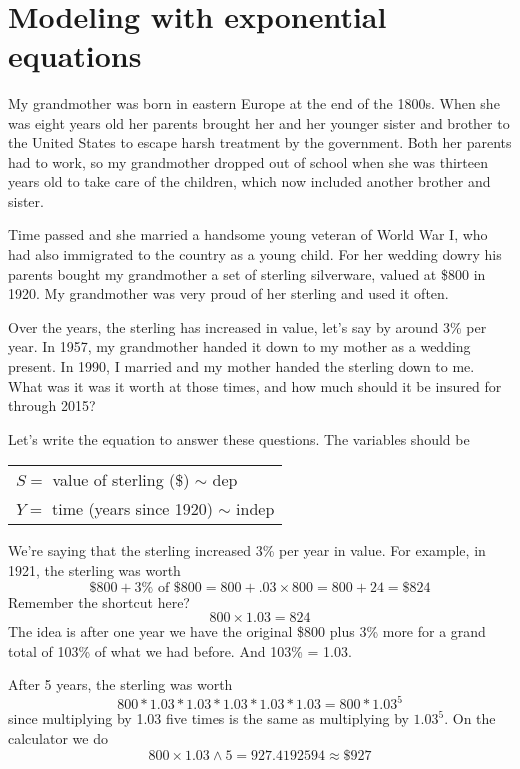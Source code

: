 ~\vspace{.1in}

\section{Modeling with exponential equations}

My grandmother was born in eastern Europe at the end of the 1800s.  When she was eight years old her parents brought her and her younger sister and brother to the United States to escape harsh treatment by the government.  Both her parents had to work, so my grandmother dropped out of school when she was thirteen years old to take care of the children, which now included another brother and sister. 

Time passed and she married a handsome young veteran of World War I, who had also immigrated to the country as a young child.  
For her wedding dowry his parents bought my grandmother a set of sterling silverware, valued at \$800 in 1920.  My grandmother was very proud of her sterling and used it often.

Over the years, the sterling has increased in value, let's say by around 3\% per year.  In 1957, my grandmother handed it down to my mother as a wedding present.  In 1990, I married and my mother handed the sterling down to me.   What was it was it worth at those times, and how much should it be insured for through 2015?  

Let's write the equation to answer these questions.  The variables should be

\begin{tabular} {l} 
$S=$ value of sterling (\$) $\sim$ dep \\ 
$Y =$ time (years since 1920) $\sim$ indep \\
\end{tabular}


We're saying that the sterling increased 3\% per year in value.  For example, in 1921, the sterling was worth
$$\$800 + 3\% \text{ of } \$800 = 800 + .03 \times 800 = 800 + 24= \$824$$
Remember the shortcut here? 
$$800 \times 1.03 = 824$$
The idea is after one year we have the original \$800 plus 3\% more for a grand total of 103\% of what we had before.  And 103\% = 1.03.  

After 5 years, the sterling was worth
$$800 \ast 1.03 \ast 1.03  \ast 1.03  \ast 1.03  \ast 1.03 = 800 \ast 1.03^5$$ 
since multiplying by 1.03 five times is the same as multiplying by $1.03^5$.
On the calculator we do
$$800 \times 1.03 \wedge 5 = 927.4192594 \approx \$927$$

